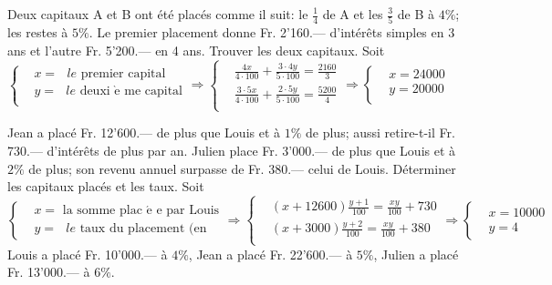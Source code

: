 \begin{solution}
Deux capitaux A et B ont été placés comme il suit: le $\frac{1}{4}$ de A et les $\frac{3}{5}$ de B à $4 \%$; les restes à $5  \%$. Le premier placement donne Fr. 2’160.— d’intérêts simples en 3 ans et l’autre Fr. 5’200.— en 4 ans. Trouver les deux capitaux.
Soit $\left\{ \begin{array}{ll}
  & x=\text{ }le\text{ premier capital} \\ 
 & y=\text{ }le\text{ deuxi }\!\!\grave{\mathrm{e}}\!\!\text{ me capital} \\ 
\end{array} \right.\Rightarrow \left\{ \begin{array}{ll}
  & \frac{4x}{4\cdot 100}+\frac{3\cdot 4y}{5\cdot 100}=\frac{2160}{3} \\ 
 & \frac{3\cdot 5x}{4\cdot 100}+\frac{2\cdot 5y}{5\cdot 100}=\frac{5200}{4} \\ 
\end{array} \right.\Rightarrow \left\{ \begin{array}{ll}
  & x=24000 \\ 
 & y=20000 \\ 
\end{array} \right.$
\end{solution}

\begin{solution}
Jean a placé Fr. 12’600.— de plus que Louis et à $1 \%$ de plus; aussi retire-t-il Fr. 730.— d’intérêts de plus par an. Julien place Fr. 3’000.— de plus que Louis et à $2 \%$ de plus; son revenu annuel surpasse de Fr. 380.— celui de Louis. Déterminer les capitaux placés et les taux.
Soit $\left\{ \begin{array}{ll}
  & x=\text{ la somme plac }\!\!\acute{\mathrm{e}}\!\!\text{ e par Louis} \\ 
 & y=\text{ }le\text{ taux du placement (en  }\!\!%
\end{array} \right.\Rightarrow \left\{ \begin{array}{ll}
  & \left( x+12600 \right)\frac{y+1}{100}=\frac{xy}{100}+730 \\ 
 & \left( x+3000 \right)\frac{y+2}{100}=\frac{xy}{100}+380 \\ 
\end{array} \right.\Rightarrow \left\{ \begin{array}{ll}
  & x=10000 \\ 
 & y=4%
\end{array} \right.$
Louis a placé Fr. 10'000.— à $4 \%$, Jean a placé Fr. 22'600.— à $5 \%$, Julien a placé Fr. 13'000.— à $6 \%$.
\end{solution}

